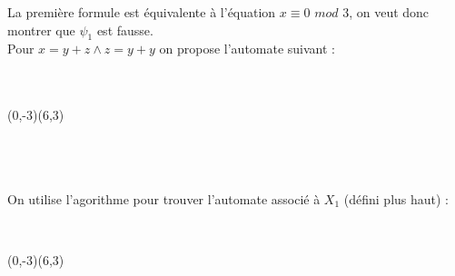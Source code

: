 \documentclass[12pt,letterpaper,boxed]{hmcpset}
\begin{document}
\begin{solution}
La première formule est équivalente à l'équation $x \equiv 0 \, \, mod \, \, 3$, on veut donc montrer que $\psi_{1}$ est fausse. \\
Pour $x = y + z \land z = y + y$ on propose l'automate suivant : \\ \\ \\ 


\begin{center}
\begin{VCPicture}{(0,-3)(6,3)}


 








\end{VCPicture}
\end{center}
\ \\ \\ \\
On utilise l'agorithme pour trouver l'automate associé à $X_{1}$ (défini plus haut)  : 

\ \\ 


\begin{center}
\begin{VCPicture}{(0,-3)(6,3)}


 







\end{VCPicture}
\end{center}
\end{solution}
\end{document}
